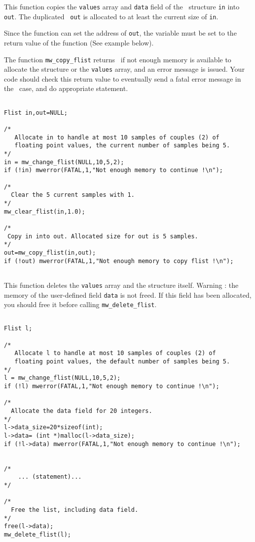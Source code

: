 \newpage %


\Description
This function copies the \verb+values+ array and \verb+data+ field 
of the \flist\ structure \verb+in+ into \verb+out+. 
The duplicated \flist\ \verb+out+ is allocated to
at least the current size of \verb+in+.

Since the function can set the address of \verb+out+, the variable must be set 
to the return value of the function (See example below).

The function \verb+mw_copy_flist+ returns \Null\ if not enough memory is 
available to allocate the structure or the \verb+values+ array, and an error 
message is issued. 
Your code should check this return value to eventually send a fatal error 
message in the \Null\ case, and do appropriate statement.

\Next
\Example
\begin{verbatim}

Flist in,out=NULL;

/* 
   Allocate in to handle at most 10 samples of couples (2) of 
   floating point values, the current number of samples being 5. 
*/
in = mw_change_flist(NULL,10,5,2);
if (!in) mwerror(FATAL,1,"Not enough memory to continue !\n");

/* 
  Clear the 5 current samples with 1.
*/
mw_clear_flist(in,1.0);

/*
 Copy in into out. Allocated size for out is 5 samples.
*/
out=mw_copy_flist(in,out);
if (!out) mwerror(FATAL,1,"Not enough memory to copy flist !\n");


\end{verbatim}

\newpage %


\Description
This function deletes the \verb+values+ array and the structure itself.
Warning : the memory of the user-defined field \verb+data+ is not freed.
If this field has been allocated, you should free it before calling
\verb+mw_delete_flist+.

\Next
\Example
\begin{verbatim}

Flist l;

/* 
   Allocate l to handle at most 10 samples of couples (2) of 
   floating point values, the default number of samples being 5. 
*/
l = mw_change_flist(NULL,10,5,2);
if (!l) mwerror(FATAL,1,"Not enough memory to continue !\n");

/* 
  Allocate the data field for 20 integers.
*/
l->data_size=20*sizeof(int);
l->data= (int *)malloc(l->data_size);
if (!l->data) mwerror(FATAL,1,"Not enough memory to continue !\n");


/*
    ... (statement)...
*/

/* 
  Free the list, including data field. 
*/
free(l->data);
mw_delete_flist(l);


\end{verbatim}

